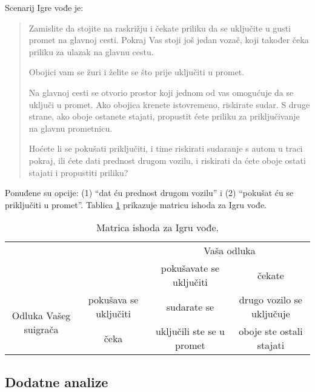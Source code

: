 \documentclass[a4paper, 12pt]{report}
\begin{document}
\begin{appendices}
Scenarij Igre vođe je: 
\begin{quote}
Zamislite da stojite na raskrižju i čekate priliku da se
uključite u gusti promet na glavnoj cesti. Pokraj Vas stoji još jedan
vozač, koji također čeka priliku za ulazak na glavnu cestu. 

Obojici vam se žuri i želite se što prije uključiti u promet.

Na glavnoj cesti se otvorio prostor koji jednom od vas omogućuje da se uključi
u promet. Ako obojica krenete istovremeno, riskirate sudar. S druge strane, ako
oboje ostanete stajati, propustit ćete priliku za priključivanje na glavnu
prometnicu.

Hoćete li se pokušati priključiti, i time riskirati sudaranje s autom u traci
pokraj, ili ćete dati prednost drugom vozilu, i riskirati da ćete oboje ostati
stajati i propustiti priliku?
\end{quote}

Ponuđene su opcije: (1) \enquote{dat ću prednost drugom vozilu} i (2)
\enquote{pokušat ću se priključiti u promet}. Tablica \ref{ivtab} prikazuje matricu ishoda
za Igru vođe. 

\begin{table}[!h]
\centering 
    \caption{Matrica ishoda za Igru vođe.\label{ivtab}}
\hspace*{-0.5cm}\begin{tabular}{cccc}
\toprule[1pt]
    & & \multicolumn{2}{c}{Vaša odluka}\\
    & & pokušavate se uključiti& čekate\\
    \cmidrule[0.5pt]{3-4}
    \multirow{2}{*}{Odluka Vašeg suigrača} & pokušava se uključiti& sudarate se
    & drugo vozilo se uključuje  \\
    & čeka & uključili ste se u promet & oboje ste ostali stajati\\
	\bottomrule[1pt]
\end{tabular}
\end{table}

\clearpage
\subsection{Dodatne analize}


\end{appendices}
\end{document}

